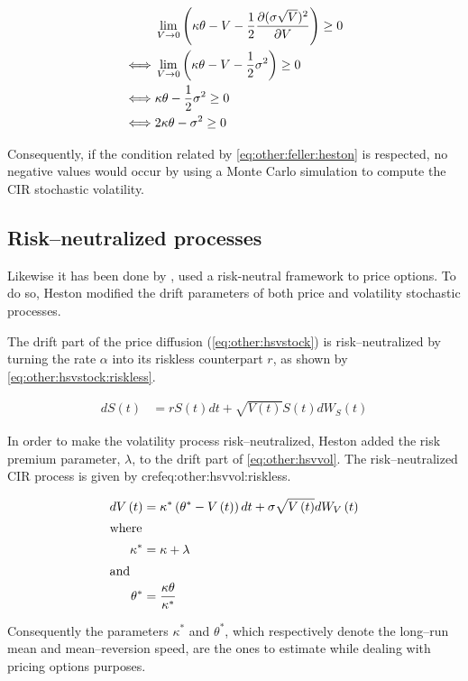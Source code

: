 \documentclass[a4paper, 12pt]{report}
\newcommand{\Bmsub}[1]{W_{#1}\left(t\right)}
\newcommand{\St}{S\left(t\right)}
\newcommand{\Vt}{V\left(t\right)}
\newcommand{\HSVstockriskless}{
  d\St &= r \St dt + \sqrt{\Vt} \St d \Bmsub{S}
}
\newcommand{\HSVvolriskless}{
  d\Vt &= \kappa^{*} \left(\theta^{*} - \Vt \right) dt + \sigma \sqrt{\Vt} d \Bmsub{V}
}
\begin{document}
\begin{align}
  &\lim_{V\to 0} \left( \kappa \theta - V - \frac{1}{2} \frac{\partial(\sigma \sqrt{V})^2}{\partial V} \right) \geq 0 \label{eq:other:feller} \\
  \iff &\lim_{V\to 0} \left( \kappa \theta - V - \frac{1}{2} \sigma^2 \right) \geq 0 \notag \\
  \iff &\kappa \theta  - \frac{1}{2} \sigma^2  \geq 0 \notag \\
  \iff & 2 \kappa \theta  - \sigma^2  \geq 0 \label{eq:other:feller:heston}
\end{align}

Consequently, if the condition related by \cref{eq:other:feller:heston} is respected, no negative values would occur by using a Monte Carlo simulation to compute the CIR stochastic volatility.

\subsection{Risk--neutralized processes}
\label{sub:other:heston:risk}

Likewise it has been done by \citet{bs}, \citet{heston1993} used a risk-neutral framework to price options.
To do so, Heston modified the drift parameters of both price and volatility stochastic processes.

The drift part of the price diffusion (\cref{eq:other:hsvstock}) is risk--neutralized by turning the rate $\alpha$ into its riskless counterpart $r$, as shown by \cref{eq:other:hsvstock:riskless}.

\begin{align}
    \HSVstockriskless \label{eq:other:hsvstock:riskless}
\end{align}

In order to make the volatility process risk--neutralized, Heston added the risk premium parameter, $\lambda$, to the drift part of \cref{eq:other:hsvvol}. The risk--neutralized CIR process is given by cref{eq:other:hsvvol:riskless}.

\begin{align}
    \HSVvolriskless \label{eq:other:hsvvol:riskless} \\
    \intertext{where}
    \kappa^{*} & = \kappa + \lambda \label{eq:other:kappa:riskless} \\
    \intertext{and}
    \theta^{*} & = \frac{\kappa \theta}{\kappa^{*}} \label{eq:other:theta:riskless}
\end{align}

Consequently the parameters $\kappa^{*}$ and $\theta^{*}$, which respectively denote the long--run mean and mean--reversion speed, are the ones to estimate while dealing with pricing options purposes. 
\end{document}
